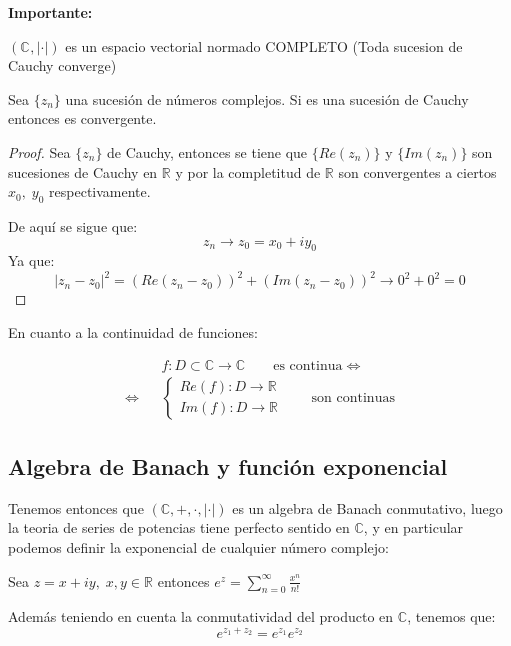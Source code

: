 \textbf{Importante: }

\((\mathbb{C}^{}, |\cdot|)\) es un espacio vectorial normado COMPLETO (Toda sucesion de Cauchy converge)

\begin{teorema}
  Sea \(\{z_n\}\) una sucesión de números complejos. Si es una sucesión de Cauchy entonces es convergente.
  \begin{proof}
    Sea \(\{z_n\}\) de Cauchy, entonces se tiene que \(\{Re(z_n)\}\) y \(\{Im(z_n)\}\) son sucesiones de Cauchy en \(\mathbb{R}\) y por la completitud de \(\mathbb{R}\) son convergentes a ciertos \(x_0, \;y_0\) respectivamente.

    De aquí se sigue que:
    \[z_n \rightarrow z_0 = x_0+iy_0\]
    Ya que:
    \[|z_n-z_0|^2=(Re(z_n-z_0))^2+(Im(z_n-z_0))^2 \rightarrow 0^2+0^2=0 \]

  \end{proof}
\end{teorema}

En cuanto a la continuidad de funciones:

\begin{eqnarray*}
  & & f:D\subset \mathbb{C} \rightarrow \mathbb{C} \qquad \text{es continua} \Leftrightarrow \\
  \Leftrightarrow & & \begin{cases}
    Re(f): D \rightarrow \mathbb{R} \\
    Im(f): D \rightarrow \mathbb{R}
  \end{cases} \qquad \text{son continuas}
\end{eqnarray*}

\subsection{Algebra de Banach y función exponencial}
Tenemos entonces que \((\mathbb{C},+,\cdot, |\cdot|)\) es un algebra de Banach conmutativo, luego la teoria de series de potencias tiene perfecto sentido en \(\mathbb{C}\), y en particular podemos definir la exponencial de cualquier número complejo:

Sea \(z=x+iy, \; x,y\in \mathbb{R}\) entonces \(e^z=\sum\limits_{n=0}^{\infty}\frac{x^n}{n!}\)

Además teniendo en cuenta la conmutatividad del producto en \(\mathbb{C}\), tenemos que:
\[e^{z_1+z_2}=e^{z_1}e^{z_2}\]

